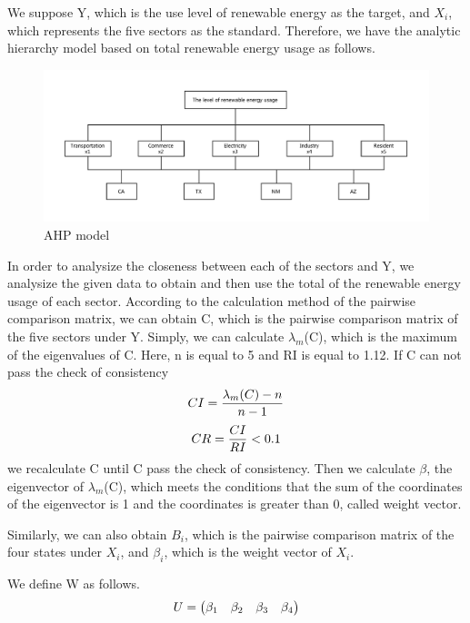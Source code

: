 \documentclass[a4paper,11pt]{article}
\begin{document}
\par We suppose Y, which is the use level of renewable energy as the target, and $X_i$, which represents the five sectors as the standard. Therefore, we have the analytic hierarchy model based on total renewable energy usage as follows.\cite{6}
\begin{figure}[!hptb] 
    \centering 
    \includegraphics[width=1.0\textwidth]{./Pic/AHP.pdf}
    \caption{AHP model}
\end{figure}
\par In order to analysize the closeness between each of the sectors and Y, we analysize the given data to obtain and then use the total of the renewable energy usage of each sector. According to the calculation method of the pairwise comparison matrix, we can obtain C, which is the pairwise comparison matrix of the five sectors under Y. Simply, we can calculate $\lambda_m$(C), which is the maximum of the eigenvalues of C. Here, n is equal to 5 and RI is equal to 1.12.\cite{6} If C can not pass the check of consistency
\begin{equation}
    \centering
    CI=\frac{ \lambda_m(C)-n }{ n-1 }
\end{equation}
\begin{equation}
        \centering
    CR=\frac{ CI }{ RI }<0.1 
\end{equation}
we recalculate C until C pass the check of consistency. Then we calculate $\beta$, the eigenvector of $\lambda_m$(C), which meets the conditions that the sum of the coordinates of the eigenvector is 1 and the coordinates is greater than 0, called weight vector.
\par Similarly, we can also obtain $B_i$, which is the pairwise comparison matrix of the four states under $X_i$, and $\beta_i$, which is the weight vector of $X_i$.
\par We define W as follows.
\begin{equation}
    \centering
U=\begin{pmatrix} \beta_1 & \beta_2 & \beta_3 & \beta_4\end{pmatrix}
\end{equation}
\end{document}
